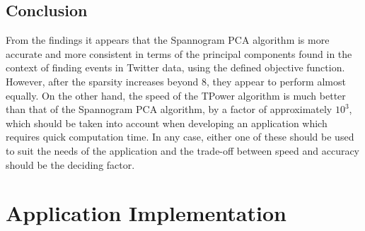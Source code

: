 \documentclass[11pt,a4paper]{article}
\begin{document}
\subsection{Conclusion}

From the findings it appears that the Spannogram PCA algorithm is more accurate and more consistent in terms of the principal components found in the context of finding events in Twitter data, using the defined objective function. However, after the sparsity increases beyond 8, they appear to perform almost equally. On the other hand, the speed of the TPower algorithm is much better than that of the Spannogram PCA algorithm, by a factor of approximately $10^3$, which should be taken into account when developing an application which requires quick computation time. In any case, either one of these should be used to suit the needs of the application and the trade-off between speed and accuracy should be the deciding factor. 
\clearpage



\section{Application Implementation}

\end{document}
